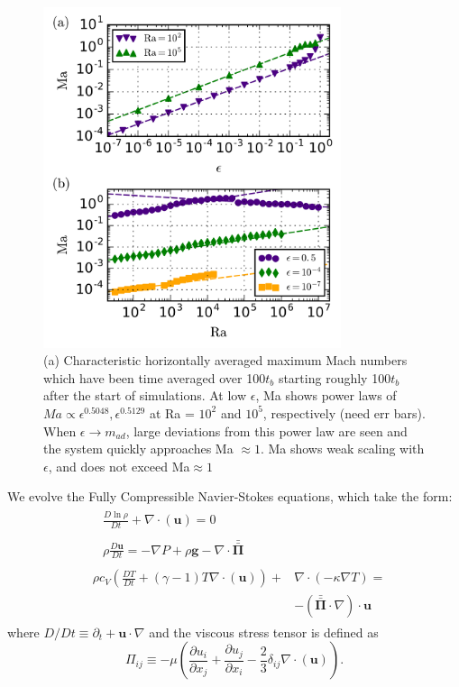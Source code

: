 \documentclass[aps, prl, twocolumn, groupedaddress, amsfonts, amssymb, amsmath]{revtex4-1}
\newcommand{\Div}[1]{\ensuremath{\nabla\cdot\left( #1\right)}}
\newcommand{\grad}{\ensuremath{\nabla}}
\newcommand{\stressT}{\ensuremath{\bm{\bar{\bar{\Pi}}}}}
\begin{document}
\begin{figure}[t]
\includegraphics[width=3.4375in]{./figs/ma_v_eps.png}
\caption{(a) Characteristic horizontally averaged maximum Mach numbers which have been
time averaged over 100$t_{b}$ starting roughly 100$t_{b}$ after the start of simulations. At low $\epsilon$,
Ma shows power laws of $Ma \propto \epsilon^{0.5048}, \epsilon^{0.5129}$ at Ra = $10^2$ and $10^5$, respectively (need err bars).
When $\epsilon \rightarrow m_{ad}$, large deviations from this power law are seen and the system quickly
approaches Ma $\approx 1$.  Ma shows weak scaling with $\epsilon$, and does not exceed Ma$ \approx 1$
\label{fig:ma_v_eps} }
\end{figure}

We evolve the Fully Compressible Navier-Stokes equations,
which take the form:
\begin{align}
&\begin{aligned}
&\frac{D \ln\rho}{D t} + \Div{\bm{u}} = 0
	\label{eqn:continuity_eqn}
\end{aligned}\\
&\begin{aligned}
&\rho\frac{D\bm{u}}{D t}=
-\grad P + \rho\bm{g} - \nabla\cdot\stressT
	\label{eqn:momentum_eqn}
\end{aligned}\\
&\begin{aligned}
\rho c_V\left(\frac{D T}{D t} + (\gamma-1)T\Div{\bm{u}}\right) + &\Div{-\kappa\grad T} = \\
&-\left(\stressT\cdot\nabla\right)\cdot\bm{u} 
	\label{eqn:energy_eqn}
\end{aligned}
\end{align}
where $D/Dt \equiv \partial_t + \bm{u}\cdot\grad$ and the viscous stress tensor is defined as
\begin{equation}
\Pi_{ij} \equiv -\mu\left(\frac{\partial u_i}{\partial x_j} + \frac{\partial u_j}{\partial x_i} - \frac{2}{3}\delta_{ij}\Div{\bm{u}}\right).
	\label{eqn:stress_tensor}
\end{equation}
\end{document}
